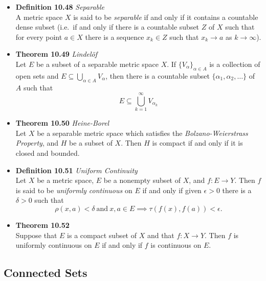 \documentclass[11pt,a4paper]{article}
\begin{document}
\begin{itemize}
    \item \textbf{Definition 10.48} \emph{Separable} \\
        A metric space $X$ is said to be \emph{separable} if and only if it contains a
        countable dense subset
        (i.e.\ if and only if there is a countable subset $Z$ of $X$ such that for every
        point $a \in X$ there is a sequence $x_k \in Z$ such that $x_k \to a$ as
        $k \to \infty$).

    \item \textbf{Theorem 10.49} \emph{Lindel\"of} \\
        Let $E$ be a subset of a separable metric space $X$.
        If ${\{V_\alpha\}}_{\alpha \in A}$ is a collection of open sets and
        $E \subseteq \bigcup_{\alpha \in A} V_\alpha$, then there is a countable subset
        $\{ \alpha_1, \alpha_2, \ldots \}$ of $A$ such that
        \[
            E \subseteq \bigcup_{k=1}^\infty V_{\alpha_k}
        \]

    \item \textbf{Theorem 10.50} \emph{Heine-Borel} \\
        Let $X$ be a separable metric space which satisfies the
        \emph{Bolzano-Weierstrass Property}, and $H$ be a subset of $X$.
        Then $H$ is compact if and only if it is closed and bounded.

    \item \textbf{Definition 10.51} \emph{Uniform Continuity} \\
        Let $X$ be a metric space, $E$ be a nonempty subset of $X$, and $f : E \to Y$.
        Then $f$ is said to be \emph{uniformly continuous} on $E$ if and only if given
        $\epsilon > 0$ there is a $\delta > 0$ such that
        \[
            \rho (x, a) < \delta \ \text{and} \ x, a \in E \implies
            \tau (f(x), f(a)) < \epsilon.
        \]

    \item \textbf{Theorem 10.52} \\
        Suppose that $E$ is a compact subset of $X$ and that $f : X \to Y$.
        Then $f$ is uniformly continuous on $E$ if and only if $f$ is continuous on $E$.

\end{itemize}

\subsection{Connected Sets}
\end{document}
